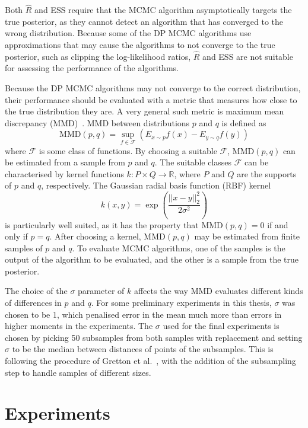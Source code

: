 \documentclass[english,twoside,openright]{HYgraduMLDS}
\newcommand{\R}{\mathbb{R}}
\begin{document}
Both \(\hat{R}\) and ESS require that the MCMC algorithm asymptotically targets 
the true posterior, as they cannot detect an algorithm that has converged to the 
wrong distribution. Because some of the DP MCMC algorithms use approximations 
that may cause the algorithms to not converge to the true posterior, 
such as clipping the log-likelihood ratios, \(\hat{R}\) and ESS are not suitable
for assessing the performance of the algorithms.

Because the DP MCMC algorithms may not converge to the correct distribution, 
their performance should be evaluated with a metric that measures how close 
to the true distribution they are. A very general such metric is maximum mean
discrepancy (MMD)~\cite{GrettonBRSS12}. MMD between distributions \(p\) and \(q\) 
is defined as 
\[
    \mathrm{MMD}(p, q) = \sup_{f\in \mathcal{F}}(E_{x\sim p}f(x) - E_{y\sim q}f(y))
\]
where \(\mathcal{F}\) is some class of functions. By 
choosing a suitable \(\mathcal{F}\), \(\mathrm{MMD}(p, q)\) can be estimated from a 
sample from \(p\) and \(q\). The suitable classes \(\mathcal{F}\) can be 
characterised by kernel functions \(k\colon P\times Q \to \R\), where
\(P\) and \(Q\) are the supports of \(p\) and \(q\), respectively.
The Gaussian radial basis function (RBF) kernel 
\[
    k(x, y) = \exp\left(\frac{||x - y||_2^2}{2\sigma^2}\right)
\]
is particularly well suited, as it has the property that 
\(\mathrm{MMD}(p, q) = 0\) if and only if \(p = q\). After choosing a kernel,
\(\mathrm{MMD}(p, q)\) may be estimated from finite samples of \(p\) and \(q\).
To evaluate MCMC algorithms, one of the samples is the output of the algorithm 
to be evaluated, and the other is a sample from the true posterior.

The choice of the \(\sigma\) parameter of \(k\) affects the way MMD evaluates 
different kinds of differences in \(p\) and \(q\). For some preliminary experiments
in this thesis, \(\sigma\) was chosen to be 1, which penalised error in the 
mean much more than errors in higher moments in the experiments. 
The \(\sigma\) used for the final experiments is chosen by picking 50 subsamples
from both samples with replacement and setting \(\sigma\) to be the median 
between distances of points of the subsamples. This is following the procedure of 
Gretton et al.~\cite{GrettonBRSS12}, with the addition of the subsampling step
to handle samples of different sizes.

\chapter{Experiments}\label{experiment_chapter}
\end{document}
